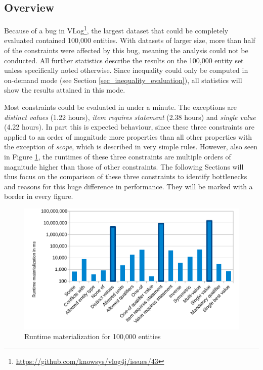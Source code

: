 \documentclass[hyperref,bachelorofscience,fleqn]{cgvpub}
\begin{document}
\subsection{Overview}

Because of a bug in VLog\footnote{\url{https://github.com/knowsys/vlog4j/issues/43}}, the largest dataset that could be completely evaluated contained 100,000 entities. With datasets of larger size, more than half of the constraints were affected by this bug, meaning the analysis could not be conducted. All further statistics describe the results on the 100,000 entity set unless specifically noted otherwise. Since inequality could only be computed in on-demand mode (see Section  \ref{sec_inequality_evaluation}), all statistics will show the results attained in this mode.

Most constraints could be evaluated in under a minute. The exceptions are \emph{distinct values} (1.22 hours), \emph{item requires statement} (2.38 hours) and \emph{single value} (4.22 hours). In part this is expected behaviour, since these three constraints are applied to an order of magnitude more properties than all other properties with the exception of \emph{scope}, which is described in very simple rules. However, also seen in Figure \ref{fig_runtime}, the runtimes of these three constraints are multiple orders of magnitude higher than those of other constraints. The following Sections will thus focus on the comparison of these three constraints to identify bottlenecks and reasons for this huge difference in performance. They will be marked with a border in every figure.

\begin{figure}
\includegraphics[width=\linewidth]{images/runtime100,000.pdf}
\caption{Runtime materialization for 100,000 entities}\label{fig_runtime}
\end{figure}
\end{document}
